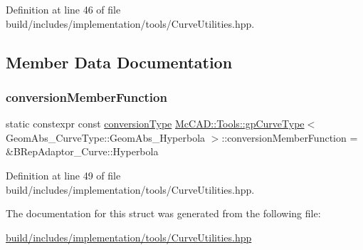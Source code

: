 Definition at line 46 of file build/includes/implementation/tools/\+Curve\+Utilities.\+hpp.



\subsection{Member Data Documentation}
\mbox{\label{structMcCAD_1_1Tools_1_1gpCurveType_3_01GeomAbs__CurveType_1_1GeomAbs__Hyperbola_01_4_a0ab5b7131b16601493f3745dba0dfdf1}} 
\subsubsection{\texorpdfstring{conversion\+Member\+Function}{conversionMemberFunction}}
{\footnotesize\ttfamily static constexpr const \hyperlink{structMcCAD_1_1Tools_1_1gpCurveType_3_01GeomAbs__CurveType_1_1GeomAbs__Hyperbola_01_4_a0b812f11998e2a5801e6a5b91e1b303c}{conversion\+Type} \hyperlink{structMcCAD_1_1Tools_1_1gpCurveType}{Mc\+C\+A\+D\+::\+Tools\+::gp\+Curve\+Type}$<$ Geom\+Abs\+\_\+\+Curve\+Type\+::\+Geom\+Abs\+\_\+\+Hyperbola $>$\+::conversion\+Member\+Function = \&B\+Rep\+Adaptor\+\_\+\+Curve\+::\+Hyperbola\hspace{0.3cm}{\ttfamily [static]}}



Definition at line 49 of file build/includes/implementation/tools/\+Curve\+Utilities.\+hpp.



The documentation for this struct was generated from the following file\+:\begin{DoxyCompactItemize}
\item 
\hyperlink{build_2includes_2implementation_2tools_2CurveUtilities_8hpp}{build/includes/implementation/tools/\+Curve\+Utilities.\+hpp}\end{DoxyCompactItemize}
